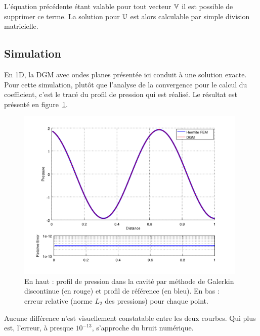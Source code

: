 L'équation précédente étant valable pour tout vecteur $\mathbb{V}$ il est possible de supprimer ce terme.
La solution pour $\mathbb{U}$ est alors calculable par simple division matricielle.

\subsection{Simulation}

En 1D, la DGM avec ondes planes présentée ici conduit à une solution exacte. Pour cette simulation, plutôt que l'analyse
de la convergence pour le calcul du coefficient, c'est le tracé du profil de pression qui est réalisé. Le résultat est
présenté en figure~\ref{fig:dgm:simul}.

\begin{figure}[!ht]
    \centering
    \includegraphics[width=11cm]{part2/figs/comp_hermiteFEM_dgm.png}
    \caption{\label{fig:dgm:simul}En haut : profil de pression dans la cavité par méthode de Galerkin discontinue (en rouge) et
    profil de référence (en bleu). En bas : erreur relative (norme $L_2$ des pressions) pour chaque point.}
\end{figure}

Aucune différence n'est visuellement constatable entre les deux courbes. Qui plus est, l'erreur, à presque $10^{-13}$,
s'approche du bruit numérique.
